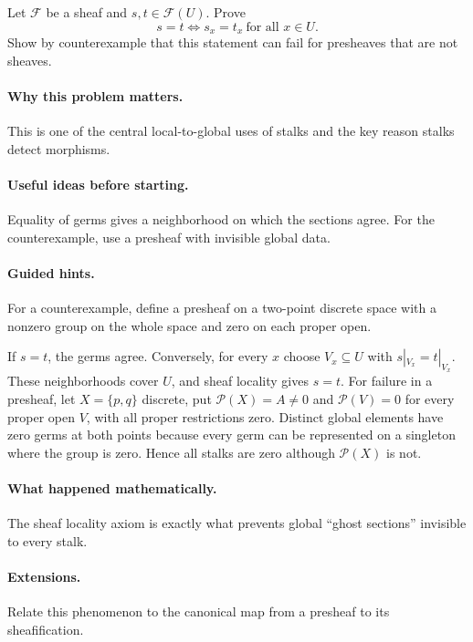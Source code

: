 \begin{problem}
Let $\mathcal F$ be a sheaf and $s,t\in\mathcal F(U)$. Prove
\[
s=t\iff s_x=t_x\ \text{for all }x\in U.
\]
Show by counterexample that this statement can fail for presheaves that are not sheaves.
\end{problem}

\paragraph{Why this problem matters.}
This is one of the central local-to-global uses of stalks and the key reason stalks detect morphisms.

\paragraph{Useful ideas before starting.}
Equality of germs gives a neighborhood on which the sections agree. For the counterexample, use a presheaf with invisible global data.

\paragraph{Guided hints.}
For a counterexample, define a presheaf on a two-point discrete space with a nonzero group on the whole space and zero on each proper open.

\ifdefined\FullProblemDossiers
\begin{solution}
If $s=t$, the germs agree. Conversely, for every $x$ choose $V_x\subseteq U$ with $s|_{V_x}=t|_{V_x}$. These neighborhoods cover $U$, and sheaf locality gives $s=t$. For failure in a presheaf, let $X=\{p,q\}$ discrete, put $\mathcal P(X)=A\neq0$ and $\mathcal P(V)=0$ for every proper open $V$, with all proper restrictions zero. Distinct global elements have zero germs at both points because every germ can be represented on a singleton where the group is zero. Hence all stalks are zero although $\mathcal P(X)$ is not.
\end{solution}

\paragraph{What happened mathematically.}
The sheaf locality axiom is exactly what prevents global ``ghost sections'' invisible to every stalk.

\paragraph{Extensions.}
Relate this phenomenon to the canonical map from a presheaf to its sheafification.
\fi
